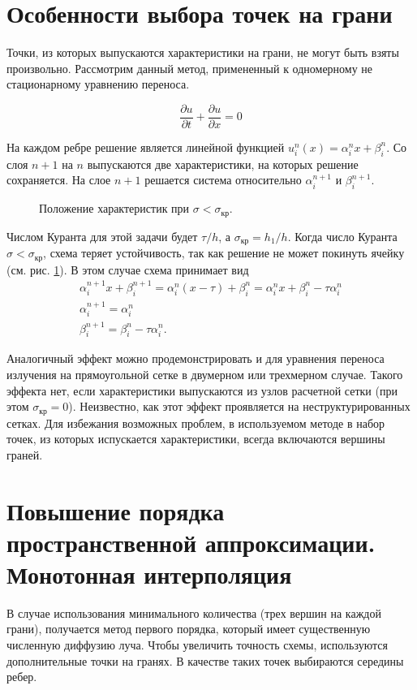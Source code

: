 \section{Особенности выбора точек на грани}
Точки, из которых выпускаются характеристики на грани, не могут быть взяты произвольно. Рассмотрим данный метод, примененный к одномерному не стационарному уравнению переноса.

\begin {equation}
\frac{\partial u}{\partial t} + \frac{\partial u}{\partial x} = 0
\end {equation}

На каждом ребре решение является линейной функцией $u_i^n(x) = \alpha_i^nx+\beta_i^n $. Со слоя $n+1$ на $n$ выпускаются две характеристики, на которых решение сохраняется. На слое $n+1$ решается система относительно $\alpha_i^{n+1}$ и $\beta_i^{n+1}$. 

\begin{figure}[ht!]
\caption{Положение характеристик при $\sigma < \sigma_\text{кр}$.}
\label{fig:5}
\end{figure}
Числом Куранта для этой задачи будет $\tau/h$, а $\sigma_\text{кр} = h_1/h$. Когда число Куранта $\sigma < \sigma_\text{кр}$, схема теряет устойчивость, так как решение не может покинуть ячейку (см. рис. \ref{fig:5}). В этом случае схема принимает вид
\begin{gather*}
\alpha^{n+1}_i x + \beta^{n+1}_i = \alpha^{n}_i (x - \tau) + \beta^{n}_i
= \alpha^{n}_i x + \beta^{n}_i - \tau \alpha_i^{n}\\
\alpha^{n+1}_i = \alpha^n_i\\
\beta^{n+1}_i = \beta^n_i - \tau \alpha^n_i.
\end{gather*}

Аналогичный эффект можно продемонстрировать и для уравнения переноса излучения на прямоугольной сетке в двумерном или трехмерном случае. Такого эффекта нет, если характеристики выпускаются из узлов расчетной сетки (при этом $\sigma_\text{кр} = 0$). Неизвестно, как этот эффект проявляется на неструктурированных сетках. Для избежания возможных проблем, в используемом методе в набор точек, из которых испускается характеристики, всегда включаются вершины граней. 
\section{Повышение порядка пространственной аппроксимации. Монотонная интерполяция}
В случае использования минимального количества (трех вершин на каждой грани), получается метод первого порядка, который имеет существенную численную диффузию луча. Чтобы увеличить точность схемы, используются дополнительные точки на гранях. В качестве таких точек выбираются середины ребер. 


